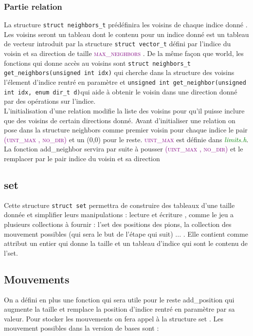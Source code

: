 \documentclass[a4paper]{article}
\begin{document}
\subsubsection{Partie relation}
La structure \lstinline|struct neighbors_t| prédéfinira les voisins de chaque indice donné . Les voisins seront un tableau dont le contenu pour un indice donné est un tableau de vecteur introduit par la structure \lstinline|struct vector_t| défini par l’indice du voisin et sa direction de taille \textcolor{purple}{\textsc{max\_neighbors}} . De la même façon que world, les fonctions qui donne accès au voisins sont \lstinline|struct neighbors_t get_neighbors(unsigned int idx)| qui cherche dans la structure des voisins l’élement d’indice rentré en paramètre et \lstinline|unsigned int get_neighbor(unsigned int idx, enum dir_t d)|qui aide à obtenir le voisin dans une direction donné par des opérations sur l’indice.\\ 

L’initialisation d’une relation modifie la liste des voisins pour qu’il puisse inclure que des voisins de certain directions donné. Avant d’initialiser une relation on pose dans la structure neighbors comme premier voisin pour chaque indice le pair \textcolor{purple}{\textsc{(uint\_max , no\_dir)}} et un (0,0) pour le reste. \textcolor{purple}{\textsc{uint\_max}} est définie dans \textcolor{green}{\textit{limits.h}}. La fonction add\_neighbor servira par suite à pousser \textcolor{purple}{\textsc{(uint\_max , no\_dir)}} et le remplacer par le pair indice du voisin et sa direction 
\subsection{set}
Cette structure \lstinline|struct set|  permettra de construire des tableaux d’une taille donnée et simplifier leurs manipulations : lecture et écriture , comme le jeu a plusieurs collections à fournir : l’set des positions des pions, la collection des mouvement possibles (qui sera le but de l’étape qui suit) ... . Elle contient comme attribut un entier qui donne la taille et un tableau d'indice qui sont le contenu de l'set.
\subsection{Mouvements}
On a défini en plus une fonction qui sera utile pour le reste add\_position qui augmente la taille et remplace la position d’indice rentré en paramètre par sa valeur. 
Pour stocker les mouvements on fera appel à la structure set . Les mouvement possibles dans la version de bases sont :  
\end{document}
